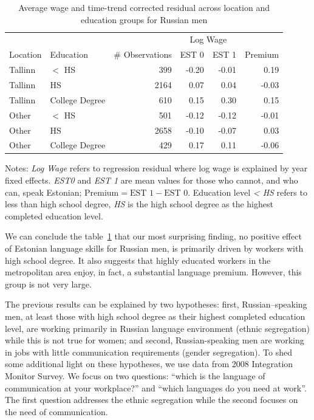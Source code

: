 \documentclass[12pt, a4paper]{article}
\begin{document}
\begin{table}[ht]
  \centering
  \caption{Average wage and time-trend corrected residual across
    location and education groups for Russian men}
  \begin{tabular}{llrrrr}
    \toprule
    & & &\multicolumn{2}{c}{Log Wage}\\
    Location & Education & \# Observations & EST 0 & EST 1 & Premium\\
    \midrule
    Tallinn & $<$ HS & 399 & -0.20 & -0.01 & 0.19 \\ 
    Tallinn & HS & 2164 & 0.07 & 0.04 & -0.03 \\ 
    Tallinn & College Degree & 610 & 0.15 & 0.30 & 0.15 \\ 
    Other & $<$ HS & 501 & -0.12 & -0.12 & -0.01 \\ 
    Other & HS & 2658 & -0.10 & -0.07 & 0.03 \\ 
    Other & College Degree & 429 & 0.17 & 0.11 & -0.06 \\ 
    \bottomrule
  \end{tabular}
  \begin{flushleft}
    Notes: \emph{Log Wage} refers to regression residual where log
    wage is explained by year fixed effects.  \emph{EST0} and
    \emph{EST 1} are mean values for those who cannot, and who can,
    speak Estonian; $\text{Premium} = \text{EST 1} - \text{EST 0}$.
    Education level \emph{< HS} refers to less than high school
    degree, \emph{HS} is the high school degree as the highest
    completed education level.
  \end{flushleft}
  \label{tab:loc-lang-edu}
\end{table}

We can conclude the table~\ref{tab:loc-lang-edu} that our
most surprising finding, no positive effect of Estonian language
skills for Russian men, is primarily driven by workers with
high school degree.  It also suggests that highly educated workers in
the metropolitan area enjoy, in fact, a substantial language premium.
However, this group is not very large.

The previous results can be explained by two hypotheses: first,
Russian--speaking men, at least those with high school degree as their
highest completed education level, are working
primarily in Russian language environment (ethnic segregation) while this is not true for
women; and second, Russian-speaking men are working in jobs with
little communication requirements (gender segregation).
To shed some additional light on these hypotheses, we use data
from 2008 Integration Monitor Survey.  We focus on
two questions: ``which is the language of communication at your
workplace?'' and ``which languages do you need at work''.  The first
question addresses the ethnic segregation while the second focuses on
the need of communication.  
\end{document}
